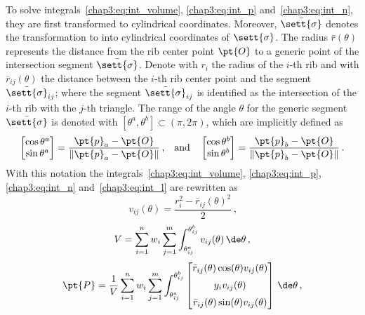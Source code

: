 To solve integrals~\eqref{chap3:eq:int_volume}, \eqref{chap3:eq:int_p} and~\eqref{chap3:eq:int_n}, they are first transformed to cylindrical coordinates. Moreover, $\bar{\sett{\sigma}}$ denotes the transformation to into cylindrical coordinates of $\sett{\sigma}$. The radius $\bar{r}(\theta)$ represents the distance from the rib center point $\pt{O}$ to a generic point of the intersection segment $\bar{\sett{\sigma}}$. Denote with $r_i$ the radius of the $i$-th rib and with $\bar{r}_{ij}(\theta)$ the distance between the $i$-th rib center point and the segment $\bar{\sett{\sigma}}_{ij}$; where the segment $\bar{\sett{\sigma}}_{ij}$ is identified as the intersection of the $i$-th rib with the $j$-th triangle. The range of the angle $\theta$ for the generic segment $\bar{\sett{\sigma}}$ is denoted with $[\theta^a,\theta^b]\subset (\pi,2\pi)$, which are implicitly defined as
%
\begin{equation*}
  \begin{bmatrix} \cos \theta^a \\ \sin \theta^a \end{bmatrix}=
  \dfrac{\pt{p}_a - \pt{O}}{\|\pt{p}_a - \pt{O}\|}
  \,\text{,} \quad \text{and} \quad
  \begin{bmatrix} \cos \theta^b \\ \sin \theta^b \end{bmatrix}=
  \dfrac{\pt{p}_b - \pt{O}}{\|\pt{p}_b - \pt{O}\|}
  \,\text{.}
\end{equation*}
%
With this notation the integrals~\eqref{chap3:eq:int_volume}, \eqref{chap3:eq:int_p}, \eqref{chap3:eq:int_n} and~\eqref{chap3:eq:int_l} are rewritten as
%
\begin{equation}
  v_{ij}(\theta) = \dfrac{r_i^2-\bar{r}_{ij}(\theta)^2}{2}
  \,\text{,}
  \label{chap3:eq:int_v_ij}
\end{equation}
%
\begin{equation}
  V = \sum_{i=1}^{n}w_i \sum_{j=1}^{m} \int_{\theta^a_{ij}}^{\theta^b_{ij}} v_{ij}(\theta) \, \de\theta
  \,\text{,}
  \label{chap3:eq:int_v_cyl}
\end{equation}
%
\begin{equation}
  \pt{P} =
    \dfrac{1}{V} \sum_{i=1}^{n}w_i\sum_{j=1}^{m} \displaystyle\int_{\theta^a_{ij}}^{\theta^b_{ij}}
  \begin{bmatrix}
    \bar{r}_{ij}(\theta)\cos(\theta)v_{ij}(\theta)
    \\[2mm]
    y_i v_{ij}(\theta)
    \\[2mm]
    \bar{r}_{ij}(\theta)\sin(\theta)v_{ij}(\theta)
  \end{bmatrix} \, \de\theta
  \,\text{,}
  \label{chap3:eq:int_p_cyl}
\end{equation}
